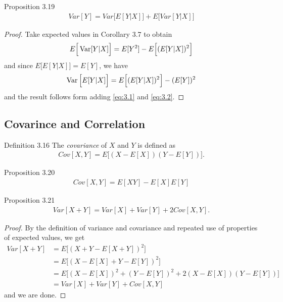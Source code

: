 \begin{boks}{Proposition 3.19}
  \begin{align*}
    Var[Y] = Var\Big[ E[Y|X] \Big] + E\Big[Var[Y|X]\Big]
  \end{align*}
\end{boks}
\begin{proof}
  Take expected values in Corollary 3.7 to obtain
  \begin{align}\label{eq:3.1}
    E\Big[ \operatorname{Var}[Y|X] \Big] = E[Y^2] - E \Big[ (E[Y|X])^2 \Big]
  \end{align}
  and since $E\Big[E[Y|X]\Big] = E[Y]$, we have
  \begin{align}\label{eq:3.2}
    \operatorname{Var}\Big[ E[Y|X] \Big] = E\Big[ (E[Y|X])^2 \Big] - (E[Y])^2
  \end{align}
  and the result follows form adding \eqref{eq:3.1} and \eqref{eq:3.2}.
\end{proof}

\subsection{Covarince and Correlation}

\begin{boks}{Definition 3.16}
  The \textit{covariance} of $X$ and $Y$ is defined as
  \begin{align*}
    Cov[X, Y] = E\Big[(X - E[X])(Y - E[Y])\Big].
  \end{align*}
\end{boks}

\begin{boks}{Proposition 3.20}
  \begin{align*}
    Cov[X, Y] = E[XY] - E[X]E[Y]
  \end{align*}
\end{boks}
%
%
\begin{boks}{Proposition 3.21}
  \begin{align*}
    Var[X + Y] = Var[X] + Var[Y] + 2Cov[X, Y].
  \end{align*}
\end{boks}

\begin{proof}
  By the definition of variance and covariance and repeated use of properties of expected values, we get
  \begin{align*}
    Var[X + Y] &= E\Big[(X + Y - E[X + Y])^2]\\
    &= E\Big[(X - E[X] + Y - E[Y])^2]\\
    &= E\Big[(X - E[X])^2 + (Y - E[Y])^2 + 2(X - E[X])(Y - E[Y])]\\
    &= Var[X] + Var[Y] + Cov[X, Y]
  \end{align*}
  and we are done.
\end{proof}

